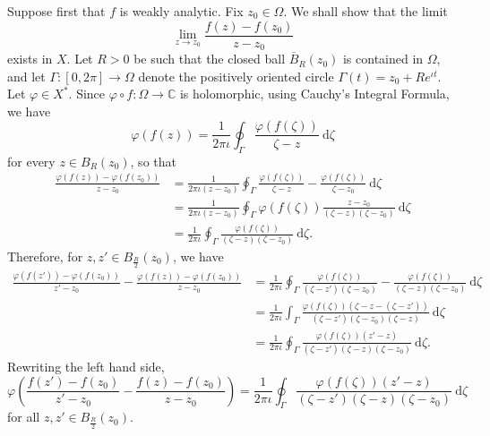 \documentclass[11pt]{article}
\theoremstyle{thmstyle}
\theoremstyle{defstyle}
\newcommand{\bbC}{\mathbb{C}}
\begin{document}
Suppose first that $f$ is weakly analytic. Fix $z_0\in\Omega$. We shall show that the limit 
\begin{equation*}
    \lim_{z\to z_0}\frac{f(z) - f(z_0)}{z - z_0}
\end{equation*}
exists in $X$. Let $R > 0$ be such that the closed ball $\overline B_R(z_0)$ is contained in $\Omega$, and let $\Gamma\colon [0, 2\pi]\to\Omega$ denote the positively oriented circle $\Gamma(t) = z_0 + Re^{\iota t}$. Let $\varphi\in X^\ast$. Since $\varphi \circ f\colon\Omega\to\bbC$ is holomorphic, using Cauchy's Integral Formula, we have 
\begin{equation*}
    \varphi(f(z)) = \frac{1}{2\pi\iota}\oint_\Gamma \frac{\varphi(f(\zeta))}{\zeta - z}~\mathrm d\zeta
\end{equation*}
for every $z\in B_R(z_0)$, so that 
\begin{align*}
    \frac{\varphi(f(z)) - \varphi(f(z_0))}{z - z_0} &= \frac{1}{2\pi\iota(z - z_0)}\oint_\Gamma\frac{\varphi(f(\zeta))}{\zeta - z} - \frac{\varphi(f(\zeta))}{\zeta - z_0}~\mathrm d\zeta\\
    &= \frac{1}{2\pi\iota(z - z_0)}\oint_\Gamma\varphi(f(\zeta))\frac{z - z_0}{(\zeta - z)(\zeta - z_0)}~\mathrm d\zeta\\
    &= \frac{1}{2\pi\iota}\oint_\Gamma\frac{\varphi(f(\zeta))}{(\zeta - z)(\zeta - z_0)}~\mathrm d\zeta.
\end{align*}
Therefore, for $z, z'\in B_{\frac{R}{2}}(z_0)$, we have 
\begin{align*}
    \frac{\varphi(f(z')) - \varphi(f(z_0))}{z' - z_0} - \frac{\varphi(f(z)) - \varphi(f(z_0))}{z - z_0} &= \frac{1}{2\pi\iota}\oint_{\Gamma}\frac{\varphi(f(\zeta))}{(\zeta - z')(\zeta - z_0)} - \frac{\varphi(f(\zeta))}{(\zeta - z)(\zeta - z_0)}~\mathrm d\zeta \\
    &= \frac{1}{2\pi\iota}\int_\Gamma\frac{\varphi(f(\zeta))\left(\zeta - z - (\zeta - z')\right)}{(\zeta - z')(\zeta - z_0)(\zeta - z)}~\mathrm d\zeta\\
    &= \frac{1}{2\pi\iota}\oint_\Gamma\frac{\varphi(f(\zeta))(z' - z)}{(\zeta - z')(\zeta - z)(\zeta - z_0)}~\mathrm d\zeta.
\end{align*}
Rewriting the left hand side,
\begin{equation}\label{cauchy-esque}\tag{$\dagger$}
    \varphi\left(\frac{f(z') - f(z_0)}{z' - z_0} - \frac{f(z) - f(z_0)}{z - z_0}\right) = \frac{1}{2\pi\iota}\oint_\Gamma\frac{\varphi(f(\zeta))(z' - z)}{(\zeta - z')(\zeta - z)(\zeta - z_0)}~\mathrm d\zeta
\end{equation}
for all $z, z'\in B_{\frac{R}{2}}(z_0)$.
\end{document}
